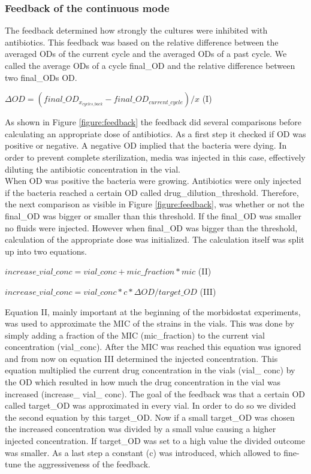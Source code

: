\subsubsection{Feedback of the continuous mode} 
The feedback determined how strongly the cultures were inhibited with antibiotics. This feedback was based on the relative difference between the averaged ODs of the current cycle and the averaged ODs of a past cycle. We called the average ODs of a cycle final\_OD and the relative difference between two final\_ODs \textDelta OD. 
\begin{center}
	$\Delta OD = (final\_OD_{x_{cycles\_back}} - final\_OD_{current\_cycle})/x$ \quad (I) 
\end{center}
As shown in Figure \ref{figure:feedback} the feedback did several comparisons before calculating an appropriate dose of antibiotics. As a first step it checked if \textDelta OD was positive or negative. A negative \textDelta OD implied that the bacteria were dying. In order to prevent complete sterilization, media was injected in this case, effectively diluting the antibiotic concentration in the vial. \\
When \textDelta OD was positive the bacteria were growing. Antibiotics were only injected if the bacteria reached a certain OD called drug\_dilution\_threshold. Therefore, the next comparison as visible in Figure \ref{figure:feedback}, was whether or not the final\_OD was bigger or smaller than this threshold. If the final\_OD was smaller no fluids were injected.
However when final\_OD was bigger than the threshold, calculation of the appropriate dose was initialized.
The calculation itself was split up into two equations.
\begin{center}
	$increase\_vial\_conc = vial\_conc + mic\_fraction*mic$ \quad (II) \label{eq:plus}
\end{center}
\begin{center}	
	$increase\_vial\_conc = vial\_conc * c * \Delta OD/target\_OD$ \quad (III) \label{eq:mult}
\end{center}
Equation II, mainly important at the beginning of the morbidostat experiments, was used to approximate the MIC of the strains in the vials. This was done by simply adding a fraction of the MIC (mic\_fraction) to the current vial concentration (vial\_conc). After the MIC was reached this equation was ignored and from now on equation III determined the injected concentration. This equation multiplied the current drug concentration in the vials (vial\_ conc) by the \textDelta OD which resulted in how much the drug concentration in the vial was increased (increase\_ vial\_ conc).
The goal of the feedback was that a certain OD called target\_OD was approximated in every vial. In order to do so we divided the second equation by this target\_OD. Now if a small target\_OD was chosen the increased concentration was divided by a small value causing a higher injected concentration. If target\_OD was set to a high value the divided outcome was smaller. As a last step a constant (c) was introduced, which allowed to fine-tune the aggressiveness of the feedback.   

